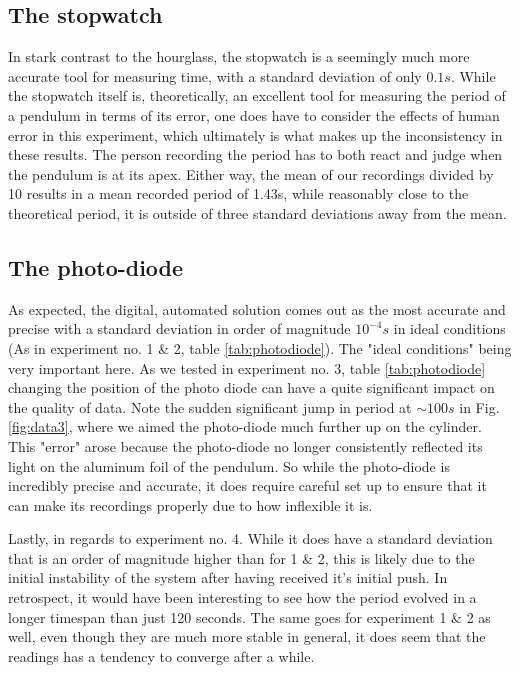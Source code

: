 \documentclass[%
 reprint,
 amsmath,amssymb,
 aps,
]{revtex4-1}
\begin{document}
	\subsection{The stopwatch}
		In stark contrast to the hourglass, the stopwatch is a seemingly much more accurate tool for measuring time, with a standard deviation of only $0.1s$. While the stopwatch itself is, theoretically, an excellent tool for measuring the period of a pendulum in terms of its error, one does have to consider the effects of human error in this experiment, which ultimately is what makes up the inconsistency in these results. The person recording the period has to both react and judge when the pendulum is at its apex. Either way, the mean of our recordings divided by 10 results in a mean recorded period of 1.43s, while reasonably close to the theoretical period, it is outside of three standard deviations away from the mean.

	\subsection{The photo-diode}
		As expected, the digital, automated solution comes out as the most accurate and precise with a standard deviation in order of magnitude $10^{-4}s$ in ideal conditions (As in experiment no. 1 \& 2, table \ref{tab:photodiode}). The "ideal conditions" being very important here. As we tested in experiment no. 3, table \ref{tab:photodiode} changing the position of the photo diode can have a quite significant impact on the quality of data. Note the sudden significant jump in period at $\sim 100s$ in Fig. \ref{fig:data3}, where we aimed the photo-diode much further up on the cylinder. This "error" arose because the photo-diode no longer consistently reflected its light on the aluminum foil of the pendulum. So while the photo-diode is incredibly precise and accurate, it does require careful set up to ensure that it can make its recordings properly due to how inflexible it is. 

		Lastly, in regards to experiment no. 4. While it does have a standard deviation that is an order of magnitude higher than for 1 \& 2, this is likely due to the initial instability of the system after having received it's initial push. In retrospect, it would have been interesting to see how the period evolved in a longer timespan than just 120 seconds. The same goes for experiment 1 \& 2 as well, even though they are much more stable in general, it does seem that the readings has a tendency to converge after a while. 
 
\end{document}
